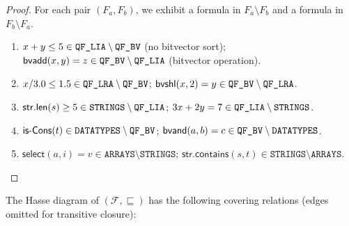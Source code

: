 \documentclass[11pt]{article}
\begin{document}
\begin{proof}
For each pair $(F_a, F_b)$, we exhibit a formula in $F_a
\setminus F_b$ and a formula in $F_b \setminus F_a$.
\begin{enumerate}[nosep,label=(\alph*)]
  \item $x + y \leq 5 \in \texttt{QF\_LIA} \setminus \texttt{QF\_BV}$ (no
    bitvector sort); $\mathsf{bvadd}(x, y) = z \in \texttt{QF\_BV}
    \setminus \texttt{QF\_LIA}$ (bitvector operation).
  \item $x / 3.0 \leq 1.5 \in \texttt{QF\_LRA} \setminus \texttt{QF\_BV}$;
    $\mathsf{bvshl}(x, 2) = y \in \texttt{QF\_BV} \setminus \texttt{QF\_LRA}$.
  \item $\mathsf{str.len}(s) \geq 5 \in \texttt{STRINGS}
    \setminus \texttt{QF\_LIA}$;
    $3x + 2y = 7 \in \texttt{QF\_LIA} \setminus \texttt{STRINGS}$.
  \item $\mathsf{is\text{-}Cons}(t) \in \texttt{DATATYPES}
    \setminus \texttt{QF\_BV}$;
    $\mathsf{bvand}(a, b) = c \in \texttt{QF\_BV} \setminus
    \texttt{DATATYPES}$.
  \item $\mathsf{select}(a, i) = v \in \texttt{ARRAYS}
    \setminus \texttt{STRINGS}$;
    $\mathsf{str.contains}(s, t) \in \texttt{STRINGS}
    \setminus \texttt{ARRAYS}$.
\end{enumerate}
\end{proof}

\begin{definition}%
\label{def:hasse}
The Hasse diagram of $(\mathcal{F}, \sqsubseteq)$ has the
following covering relations (edges omitted for transitive
closure):
\end{definition}
\end{document}

